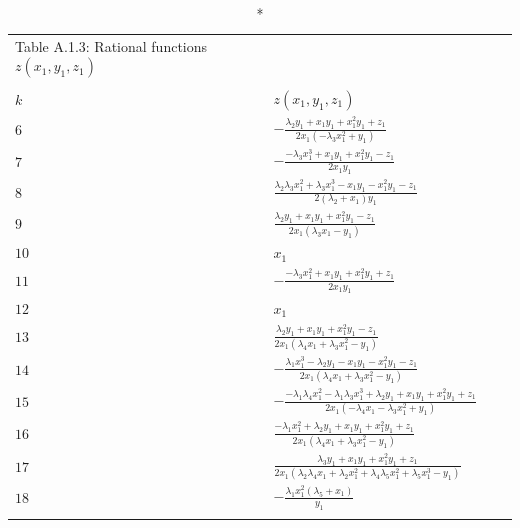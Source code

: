 \documentclass[10pt]{article}
\begin{document}
\vspace{-3mm}
{\small
\begin{longtable}{llll}
\caption*{Table A.1.3: Rational functions  $ z(x_1,y_1,z_1)$ }
\vspace{-5.5mm}\\
\\
\hline
  $k$ &  $z(x_1,y_1,z_1)$    
    \\
  \hline
  \endhead
\vspace{1mm}$6$ &
  $- \frac{\lambda_2 y_1 + x_1 y_1 + x_1^2 y_1 + z_1}{2 x_1 (-\lambda_3 x_1^2 + y_1)}$  \\
\vspace{1mm}$7$ &
 $-\frac{-\lambda_3 x_1^3 + x_1 y_1 + x_1^2 y_1 - z_1}{2 x_1 y_1}$ \\
\vspace{1mm}$8$ &
  $\frac{\lambda_2 \lambda_3 x_1^2 + \lambda_3 x_1^3 - x_1 y_1 - x_1^2 y_1 - z_1}{2 (\lambda_2 + x_1) y_1}$ \\
\vspace{1mm}$9$ &
  $\frac{\lambda_2 y_1 + x_1 y_1 + x_1^2 y_1 - z_1}{2 x_1 (\lambda_3 x_1 - y_1)}$ \\
\vspace{1mm}$10$ & 
 $x_1$ \\
\vspace{1mm}$11$ &  
$-\frac{-\lambda_3 x_1^2 + x_1 y_1 + x_1^2 y_1 + z_1}{2 x_1 y_1}$\\
\vspace{1mm}$12$ & 
$x_1$\\
\vspace{1mm}$13$ & 
 $\frac{\lambda_2 y_1 + x_1 y_1 + x_1^2 y_1 - z_1}{2 x_1 (\lambda_4 x_1 + \lambda_3 x_1^2 - y_1)}$ \\
\vspace{1mm}$14$ 
    & $-\frac{\lambda_1 x_1^3 - \lambda_2 y_1 - x_1 y_1 - x_1^2 y_1 - z_1}{
 2 x_1 (\lambda_4 x_1 + \lambda_3 x_1^2 - y_1)}$\\
\vspace{1mm}$15$ 
&  
  $-\frac{-\lambda_1 \lambda_4 x_1^2 - \lambda_1 \lambda_3 x_1^3 + \lambda_2 y_1 + x_1 y_1 + x_1^2 y_1 + z_1}{
 2 x_1 (-\lambda_4 x_1 - \lambda_3 x_1^2 + y_1)}$\\
 \vspace{1mm}$16$ & 
   $\frac{-\lambda_1 x_1^2 + \lambda_2 y_1 + x_1 y_1 + 
 x_1^2 y_1 + z_1}{2 x_1 (\lambda_4 x_1 + \lambda_3 x_1^2 - y_1)}$\\
  \vspace{1mm}$17$ &
      $\frac{\lambda_3 y_1 + x_1 y_1 + 
 x_1^2 y_1 + z_1}{2 x_1 (\lambda_2 \lambda_4 x_1 + \lambda_2 x_1^2 + \lambda_4 \lambda_5 x_1^2 + \lambda_5 x_1^3 - y_1)}$\\
 \vspace{1mm}   $18$ & 
   $-\frac{\lambda_1 x_1^2 (\lambda_5 + x_1)}{y_1}$\\
 \hline\\
\end{longtable} 
}
\end{document}
